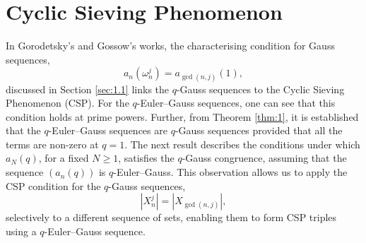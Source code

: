 \documentclass{article}
\numberwithin{equation}{section}
\theoremstyle{definition}
\begin{document}
\section{Cyclic Sieving Phenomenon}\label{sec:5}
In Gorodetsky's \cite{goro_q-gauss} and Gossow's \cite{fern_gauss} works, the characterising condition for Gauss sequences,  
\begin{equation}\label{eq:025}
    a_n(\omega_n^j)=a_{\gcd(n,j)}(1),
\end{equation}
discussed in Section \ref{sec:1.1} links the $q$-Gauss sequences to the Cyclic Sieving Phenomenon (CSP). For the $q$-Euler--Gauss sequences, one can see that this condition holds at prime powers. Further, from Theorem \ref{thm:1}, it is established that the $q$-Euler--Gauss sequences are $q$-Gauss sequences provided that all the terms are non-zero at $q=1$. The next result describes the conditions under which $a_{N}(q)$, for a fixed $N \geq 1$, satisfies the $q$-Gauss congruence, assuming that the sequence $(a_{n}(q))$ is $q$-Euler--Gauss. This observation allows us to apply the CSP condition for the $q$-Gauss sequences,
\begin{equation}\label{eq:026}
    |X_n^j| = |X_{\gcd(n,j)}|,
\end{equation}
selectively to a different sequence of sets, enabling them to form CSP triples using a $q$-Euler--Gauss sequence.
\end{document}
